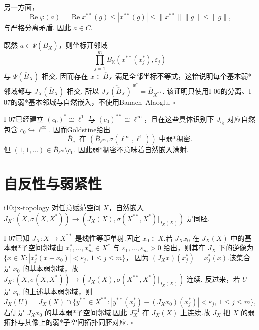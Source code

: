 \begin{FAProof}
另一方面，
\[
\operatorname{Re}\varphi(a)
=
\operatorname{Re}x^{**}(g)
\leqslant
|x^{**}(g)|
\leqslant
\|x^{**}\|\|g\|
\leqslant
\|g\|,
\]
与严格分离矛盾. 因此 \(\displaystyle a\in C\).

既然 \(\displaystyle a\in\overline{\Psi(\overline B_X)}\)，则坐标开邻域
\[
\prod_{j=1}^m
B_{\mathbb K}(x^{**}(x_j^*),\varepsilon_j)
\]
与 \(\displaystyle \Psi(\overline B_X)\) 相交. 因而存在 \(\displaystyle x\in\overline B_X\) 满足全部坐标不等式，这恰说明每个基本弱*邻域都与 \(\displaystyle J_X(\overline B_X)\) 相交. 所以
\(\displaystyle \overline{J_X(\overline B_X)}^{\,w^*} = \overline B_{X^{**}}\).
该证明只使用I-06的分离、I-07的弱*基本邻域与自然嵌入，不使用Banach--Alaoglu.
\hfill\(\square\)
\end{FAProof}

\begin{FAExample}[Goldstine稠密而非满射]
I-07已经建立 \(\displaystyle (c_0)^*\cong\ell^1\) 与 \(\displaystyle (c_0)^{**}\cong\ell^\infty\)，且在这些具体识别下 \(\displaystyle J_{c_0}\) 对应自然包含 \(\displaystyle c_0\hookrightarrow\ell^\infty\). 因而Goldstine给出
\[
\overline B_{c_0}
\text{ 在 }
(\overline B_{\ell^\infty},\sigma(\ell^\infty,\ell^1))
\text{ 中弱*稠密}.
\]
但 \(\displaystyle (1,1,\dots)\in\overline B_{\ell^\infty}\setminus c_0\). 因此弱*稠密不意味着自然嵌入满射.
\end{FAExample}

\section{自反性与弱紧性}\label{sec:i10-reflexivity}

\begin{FAProposition}{i10:jx-topology}
对任意赋范空间 \(\displaystyle X\)，自然嵌入
\(\displaystyle J_X:(X,\sigma(X,X^*)) \longrightarrow (J_X(X),\sigma(X^{**},X^*)|_{J_X(X)})\)
是同胚.
\end{FAProposition}

\begin{FAProof}
I-07已知 \(\displaystyle J_X:X\to X^{**}\) 是线性等距单射.固定 \(\displaystyle x_0\in X\).若 \(\displaystyle J_Xx_0\) 在 \(\displaystyle J_X(X)\) 中的基本弱*子空间邻域由 \(\displaystyle x_1^*,\dots,x_m^*\in X^*\) 与 \(\displaystyle \varepsilon_1,\dots,\varepsilon_m>0\) 给出，则其在 \(\displaystyle J_X\) 下的逆像为
\(\displaystyle \bigl\{x\in X:|x_j^*(x-x_0)|<\varepsilon_j,\ 1\leqslant j\leqslant m\bigr\}\)，
因为 \(\displaystyle (J_Xx)(x_j^*)=x_j^*(x)\).该集合是 \(\displaystyle x_0\) 的基本弱邻域，故 \(\displaystyle J_X:(X,\sigma(X,X^*))\to (J_X(X),\sigma(X^{**},X^*)|_{J_X(X)})\) 连续.
反过来，若 \(\displaystyle U\) 是 \(\displaystyle x_0\) 的上述基本弱邻域，则
\[
J_X(U)=J_X(X)\cap\bigl\{y^{**}\in X^{**}:|y^{**}(x_j^*)-(J_Xx_0)(x_j^*)|<\varepsilon_j,\ 1\leqslant j\leqslant m\bigr\},
\]
右侧是 \(\displaystyle J_Xx_0\) 的基本弱*子空间邻域.因此 \(\displaystyle J_X^{-1}\) 在 \(\displaystyle J_X(X)\) 上连续.故 \(\displaystyle J_X\) 把 \(\displaystyle X\) 的弱拓扑与其像上的弱*子空间拓扑同胚对应.
\hfill\(\square\)
\end{FAProof}

